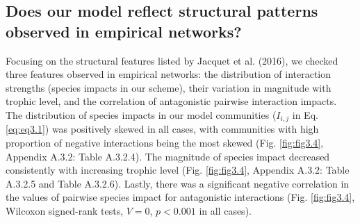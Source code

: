 \FloatBarrier

\subsection*{Does our model reflect structural patterns observed in empirical networks?}

Focusing on the structural features listed by Jacquet et al. (2016), we checked three features observed in empirical networks: the distribution of interaction strengths (species impacts in our scheme), their variation in magnitude with trophic level, and the correlation of antagonistic pairwise interaction impacts. The distribution of species impacts in our model communities ($I_{i,j}$ in Eq. \ref{eq:eq3.1}) was positively skewed in all cases, with communities with high proportion of negative interactions being the most skewed (Fig. \ref{fig:fig3.4}, Appendix A.3.2: Table A.3.2.4). The magnitude of species impact decreased consistently with increasing trophic level (Fig. \ref{fig:fig3.4}, Appendix A.3.2: Table A.3.2.5 and Table A.3.2.6). Lastly, there was a significant negative correlation in the values of pairwise species impact for antagonistic interactions (Fig. \ref{fig:fig3.4}, Wilcoxon signed-rank tests, $V = 0$, $p < 0.001$ in all cases).

